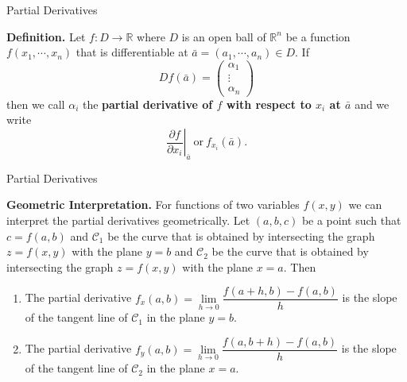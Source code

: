 \documentclass{beamer}
\begin{document}
    \begin{frame}[t]{Partial Derivatives}
        \begin{block}
            \par \textbf{Definition.} Let $f: D \to \mathbb{R}$ where $D$ is an open ball of $\mathbb{R}^n$ be a function $f(x_1, \cdots, x_n)$ that is differentiable at $\bar{a} = (a_1, \cdots, a_n) \in D$. If 
            \begin{equation*}
                D f(\bar{a})=\left(\begin{array}{c}
                \alpha_{1} \\
                \vdots \\
                \alpha_{n}
                \end{array}\right)
            \end{equation*}
            then we call $\alpha_i$ the \textbf{partial derivative of $f$ with respect to $x_i$ at $\bar{a}$} and we write
            \begin{equation*}
                \left. \dfrac{\partial f}{\partial x_i} \right|_{\bar{a}} \ \text{or} \ f_{x_i} (\bar{a}) .
            \end{equation*}
        \end{block}
    \end{frame}

    \begin{frame}[t]{Partial Derivatives}
        \par \textbf{Geometric Interpretation.} For functions of two variables $f(x,y)$ we can interpret the partial derivatives geometrically. Let $(a,b,c)$ be a point such that $c = f(a,b)$ and $\mathcal{C}_1$ be the curve that is obtained by intersecting the graph $z = f(x,y)$ with the plane $y = b$ and $\mathcal{C}_2$ be the curve that is obtained by intersecting the graph $z = f(x,y)$ with the plane $x = a$. Then 
        \begin{enumerate}
            \item The partial derivative $f_x (a,b) = \lim\limits_{h \to 0} \dfrac{f(a+h,b) - f(a,b)}{h}$ is the slope of the tangent line of $\mathcal{C}_1$ in the plane $y = b$.
            \item The partial derivative $f_y (a,b) = \lim\limits_{h \to 0} \dfrac{f(a,b+h) - f(a,b)}{h}$ is the slope of the tangent line of $\mathcal{C}_2$ in the plane $x = a$.
        \end{enumerate}
    \end{frame}
\end{document}
